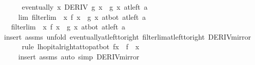 \begin{isabellebody}
\ \ \ \ \ \ {\isachardoublequoteopen}eventually\ {\isacharparenleft}{\kern0pt}{\isasymlambda}x{\isachardot}{\kern0pt}\ DERIV\ g\ x\ {\isacharcolon}{\kern0pt}{\isachargreater}{\kern0pt}\ g{\isacharprime}{\kern0pt}\ x{\isacharparenright}{\kern0pt}\ {\isacharparenleft}{\kern0pt}at{\isacharunderscore}{\kern0pt}left\ a{\isacharparenright}{\kern0pt}{\isachardoublequoteclose}\isanewline
\ \ \ \ \ lim{\isacharcolon}{\kern0pt}\ {\isachardoublequoteopen}filterlim\ {\isacharparenleft}{\kern0pt}{\isasymlambda}\ x{\isachardot}{\kern0pt}\ {\isacharparenleft}{\kern0pt}f{\isacharprime}{\kern0pt}\ x\ {\isacharslash}{\kern0pt}\ g{\isacharprime}{\kern0pt}\ x{\isacharparenright}{\kern0pt}{\isacharparenright}{\kern0pt}\ at{\isacharunderscore}{\kern0pt}bot\ {\isacharparenleft}{\kern0pt}at{\isacharunderscore}{\kern0pt}left\ a{\isacharparenright}{\kern0pt}{\isachardoublequoteclose}\isanewline
\ \ \ {\isachardoublequoteopen}filterlim\ {\isacharparenleft}{\kern0pt}{\isasymlambda}\ x{\isachardot}{\kern0pt}\ f\ x\ {\isacharslash}{\kern0pt}\ g\ x{\isacharparenright}{\kern0pt}\ at{\isacharunderscore}{\kern0pt}bot\ {\isacharparenleft}{\kern0pt}at{\isacharunderscore}{\kern0pt}left\ a{\isacharparenright}{\kern0pt}{\isachardoublequoteclose}\isanewline
%
\isadelimproof
\ \ %
\endisadelimproof
%
\isatagproof
{}\isamarkupfalse%
\ {\isacharparenleft}{\kern0pt}insert\ assms{\isacharcomma}{\kern0pt}\ unfold\ eventually{\isacharunderscore}{\kern0pt}at{\isacharunderscore}{\kern0pt}left{\isacharunderscore}{\kern0pt}to{\isacharunderscore}{\kern0pt}right\ filterlim{\isacharunderscore}{\kern0pt}at{\isacharunderscore}{\kern0pt}left{\isacharunderscore}{\kern0pt}to{\isacharunderscore}{\kern0pt}right\ DERIV{\isacharunderscore}{\kern0pt}mirror{\isacharcomma}{\kern0pt}\isanewline
\ \ \ \ \ \ rule\ lhopital{\isacharunderscore}{\kern0pt}right{\isacharunderscore}{\kern0pt}at{\isacharunderscore}{\kern0pt}top{\isacharunderscore}{\kern0pt}at{\isacharunderscore}{\kern0pt}bot{\isacharbrackleft}{\kern0pt}\ f{\isacharprime}{\kern0pt}{\isacharequal}{\kern0pt}{\isachardoublequoteopen}{\isasymlambda}x{\isachardot}{\kern0pt}\ {\isacharminus}{\kern0pt}\ f{\isacharprime}{\kern0pt}\ {\isacharparenleft}{\kern0pt}{\isacharminus}{\kern0pt}\ x{\isacharparenright}{\kern0pt}{\isachardoublequoteclose}{\isacharbrackright}{\kern0pt}{\isacharparenright}{\kern0pt}\ \isanewline
\ \ \ \ \ {\isacharparenleft}{\kern0pt}insert\ assms{\isacharcomma}{\kern0pt}\ auto\ simp{\isacharcolon}{\kern0pt}\ DERIV{\isacharunderscore}{\kern0pt}mirror{\isacharparenright}{\kern0pt}%
\endisatagproof

\end{isabellebody}
